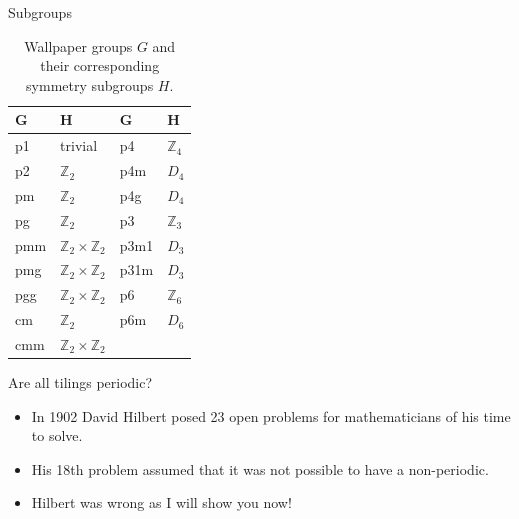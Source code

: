 \documentclass{beamer}
\begin{document}
\begin{frame}{Subgroups}
  \begin{table}
    \centering
    \begin{tabular}{@{} ll @{\qquad} ll @{}}
      \toprule
      \textbf{G} & \textbf{H} & \textbf{G} & \textbf{H} \\
      \midrule
      p1   & trivial                          & p4    & $\mathbb{Z}_4$              \\
      p2   & $\mathbb{Z}_2$                   & p4m   & $D_4$                       \\
      pm   & $\mathbb{Z}_2$                   & p4g   & $D_4$                       \\
      pg   & $\mathbb{Z}_2$                   & p3    & $\mathbb{Z}_3$              \\
      pmm  & $\mathbb{Z}_2\times\mathbb{Z}_2$ & p3m1  & $D_3$                       \\
      pmg  & $\mathbb{Z}_2\times\mathbb{Z}_2$ & p31m  & $D_3$                       \\
      pgg  & $\mathbb{Z}_2\times\mathbb{Z}_2$ & p6    & $\mathbb{Z}_6$              \\
      cm   & $\mathbb{Z}_2$                   & p6m   & $D_6$                       \\
      cmm  & $\mathbb{Z}_2\times\mathbb{Z}_2$ &       &                             \\
      \bottomrule
    \end{tabular}
    \caption{Wallpaper groups \(G\) and their corresponding symmetry subgroups \(H\).} \cite{sasse_2020}
  \end{table}
\end{frame}


\begin{frame}{Are all tilings periodic?}
    \begin{itemize}
        \item In 1902 David Hilbert posed 23 open problems for mathematicians of his time to solve. \item His 18th problem assumed that it was not possible to have a non-periodic. \cite{hilbert1902mathematical}
        \item Hilbert was wrong as I will show you now!
        \end{itemize}
\end{frame}
\end{document}
